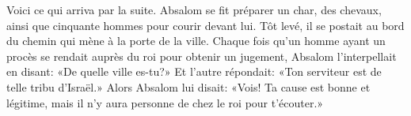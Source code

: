 Voici ce qui arriva par la suite.
Absalom se fit préparer un char, des chevaux,
	ainsi que cinquante hommes pour courir devant lui.
Tôt levé, il se postait au bord du chemin qui mène à la porte de la ville.
Chaque fois qu’un homme ayant un procès se rendait auprès du roi pour obtenir un jugement,
	Absalom l’interpellait en disant:
	«De quelle ville es-tu?»
	Et l’autre répondait: «Ton serviteur est de telle tribu d’Israël.»
Alors Absalom lui disait: «Vois! Ta cause est bonne et légitime,
	mais il n’y aura personne de chez le roi pour t’écouter.»
